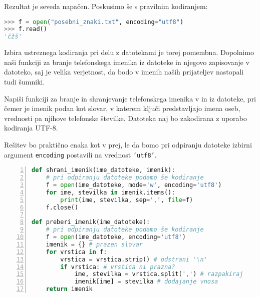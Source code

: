 Rezultat je seveda napačen. Poskusimo še s pravilnim kodiranjem:
\begin{lstlisting}[language=Python, showstringspaces=false]
>>> f = open("posebni_znaki.txt", encoding="utf8")
>>> f.read()
'čžš'
\end{lstlisting}

Izbira ustreznega kodiranja pri delu z datotekami je torej pomembna. Dopolnimo naši funkciji za branje telefonskega imenika iz datoteke in njegovo zapisovanje v datoteko, saj je velika verjetnost, da bodo v imenih naših prijateljev nastopali tudi šumniki.

\begin{zgled}
Napiši funkciji za branje in shranjevanje telefonskega imenika v in iz datoteke, pri čemer je imenik podan kot slovar, v katerem ključi predstavljajo imena oseb, vrednosti pa njihove telefonske številke. Datoteka naj bo zakodirana z uporabo kodiranja UTF-8.
\end{zgled}
\begin{resitev}
Rešitev bo praktično enaka kot v prej, le da bomo pri odpiranju datoteke izbirni argument \texttt{encoding} postavili na vrednost \texttt{'utf8'}.
\begin{lstlisting}[language=Python, showstringspaces=false,numbers=left]
def shrani_imenik(ime_datoteke, imenik):
    # pri odpiranju datoteke podamo še kodiranje
    f = open(ime_datoteke, mode='w', encoding='utf8')
    for ime, stevilka in imenik.items():
        print(ime, stevilka, sep=',', file=f)
    f.close()

def preberi_imenik(ime_datoteke):
    # pri odpiranju datoteke podamo še kodiranje
    f = open(ime_datoteke, encoding='utf8') 
    imenik = {} # prazen slovar
    for vrstica in f:
        vrstica = vrstica.strip() # odstrani '\n'
        if vrstica: # vrstica ni prazna?
            ime, stevilka = vrstica.split(',') # razpakiraj
            imenik[ime] = stevilka # dodajanje vnosa
    return imenik
\end{lstlisting}
\end{resitev}
